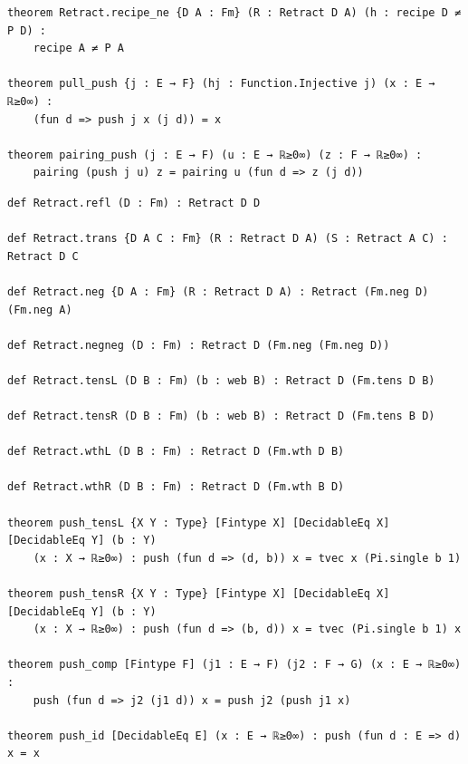 \label{lean:retract-gap}
\begin{lstlisting}
theorem Retract.recipe_ne {D A : Fm} (R : Retract D A) (h : recipe D ≠ P D) :
    recipe A ≠ P A

theorem pull_push {j : E → F} (hj : Function.Injective j) (x : E → ℝ≥0∞) :
    (fun d => push j x (j d)) = x

theorem pairing_push (j : E → F) (u : E → ℝ≥0∞) (z : F → ℝ≥0∞) :
    pairing (push j u) z = pairing u (fun d => z (j d))
\end{lstlisting}

\label{lean:retract-ops}
\begin{lstlisting}
def Retract.refl (D : Fm) : Retract D D

def Retract.trans {D A C : Fm} (R : Retract D A) (S : Retract A C) : Retract D C

def Retract.neg {D A : Fm} (R : Retract D A) : Retract (Fm.neg D) (Fm.neg A)

def Retract.negneg (D : Fm) : Retract D (Fm.neg (Fm.neg D))

def Retract.tensL (D B : Fm) (b : web B) : Retract D (Fm.tens D B)

def Retract.tensR (D B : Fm) (b : web B) : Retract D (Fm.tens B D)

def Retract.wthL (D B : Fm) : Retract D (Fm.wth D B)

def Retract.wthR (D B : Fm) : Retract D (Fm.wth B D)

theorem push_tensL {X Y : Type} [Fintype X] [DecidableEq X] [DecidableEq Y] (b : Y)
    (x : X → ℝ≥0∞) : push (fun d => (d, b)) x = tvec x (Pi.single b 1)

theorem push_tensR {X Y : Type} [Fintype X] [DecidableEq X] [DecidableEq Y] (b : Y)
    (x : X → ℝ≥0∞) : push (fun d => (b, d)) x = tvec (Pi.single b 1) x

theorem push_comp [Fintype F] (j1 : E → F) (j2 : F → G) (x : E → ℝ≥0∞) :
    push (fun d => j2 (j1 d)) x = push j2 (push j1 x)

theorem push_id [DecidableEq E] (x : E → ℝ≥0∞) : push (fun d : E => d) x = x
\end{lstlisting}

